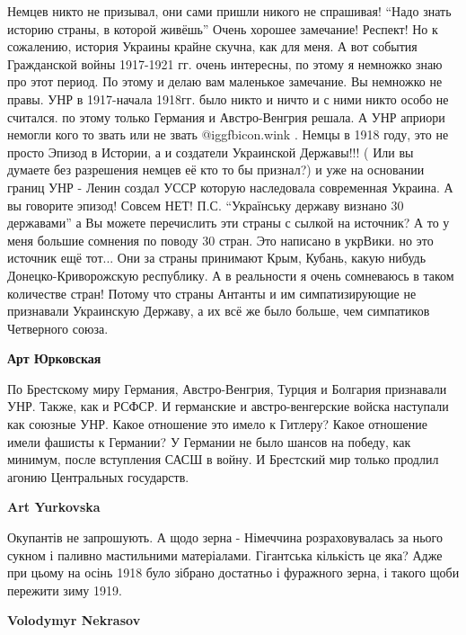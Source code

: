 \begin{itemize}
\begin{itemize}
\begin{itemize}
Немцев никто не призывал, они сами пришли никого не спрашивая! \enquote{Надо знать
историю страны, в которой живёшь} Очень хорошее замечание! Респект! Но к
сожалению, история Украины крайне скучна, как для меня. А вот события
Гражданской войны 1917-1921 гг. очень интересны, по этому я немножко знаю про
этот период. По этому и делаю вам маленькое замечание. Вы немножко не правы.
УНР в 1917-начала 1918гг. было никто и ничто и с ними никто особо не считался.
по этому только Германия и Австро-Венгрия решала. А УНР априори немогли кого то
звать или не звать  @igg{fbicon.wink} . Немцы в 1918 году, это не просто Эпизод в Истории, а и
создатели Украинской Державы!!! ( Или вы думаете без разрешения немцев её кто
то бы признал?) и уже на основании границ УНР - Ленин создал УССР которую
наследовала современная Украина. А вы говорите эпизод! Совсем НЕТ!
П.С. \enquote{Українську державу визнано 30 державами} а Вы можете перечислить эти
страны с сылкой на источник? А то у меня большие сомнения по поводу 30 стран.
Это написано в укрВики. но это источник ещё тот... Они за страны принимают
Крым, Кубань, какую нибудь Донецко-Криворожскую республику. А в реальности я
очень сомневаюсь в таком количестве стран! Потому что страны Антанты и им
симпатизирующие не признавали Украинскую Державу, а их всё же было больше, чем
симпатиков Четверного союза.

\end{itemize} %

\textbf{Арт Юрковская} 

По Брестскому миру Германия, Австро-Венгрия, Турция и Болгария признавали УНР. 
Также, как и РСФСР. И германские и австро-венгерские войска наступали как
союзные УНР. Какое отношение это имело к Гитлеру? Какое отношение имели фашисты
к Германии? У Германии не было шансов на победу, как минимум, после
вступления САСШ в войну. И Брестский мир только продлил агонию Центральных
государств.


\textbf{Art Yurkovska} 

Окупантів не запрошують. А щодо зерна - Німеччина розраховувалась за нього
сукном і паливно мастильними матеріалами. Гігантська кількість це яка? Адже при
цьому на осінь 1918 було зібрано достатньо і фуражного зерна, і такого щоби
пережити зиму 1919.

\begin{itemize} %
\textbf{Volodymyr Nekrasov} 


\end{itemize}
\end{itemize}
\end{itemize}
